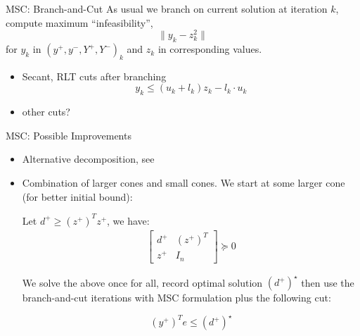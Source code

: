 \begin{frame}{MSC: Branch-and-Cut}
  As usual we branch on current solution at iteration \(k\), compute maximum ``infeasibility'',
  \[ \|y_k - z_k^2\|\]
  for \(y_k\) in \((y^+, y^-, Y^+, Y^-)_k\) and \(z_k\) in corresponding values.
  \begin{itemize}
    \item Secant, RLT cuts after branching
          \[y_k \le (u_k + l_k) z_k - l_k \cdot u_k\]
    \item other cuts?

  \end{itemize}
\end{frame}



\begin{frame}{MSC: Possible Improvements}
  \begin{itemize}
    \item Alternative decomposition, see \cite{zheng_nonconvex_2011}
    \item Combination of larger cones and small cones. We start at some larger cone (for better initial bound):

          Let \(d^+ \ge (z^+)^T z^+\), we have:
          \[\begin{aligned}
              \begin{bmatrix}d^+ & (z^+)^T\\ z^+ & I_n \end{bmatrix} \succeq 0
            \end{aligned}\]

          We solve the above once for all, record optimal solution \( (d^+)^\star\)  then use the branch-and-cut iterations with MSC formulation plus the following cut:

          \[(y^+)^Te \le (d^+)^\star\]
  \end{itemize}


\end{frame}

